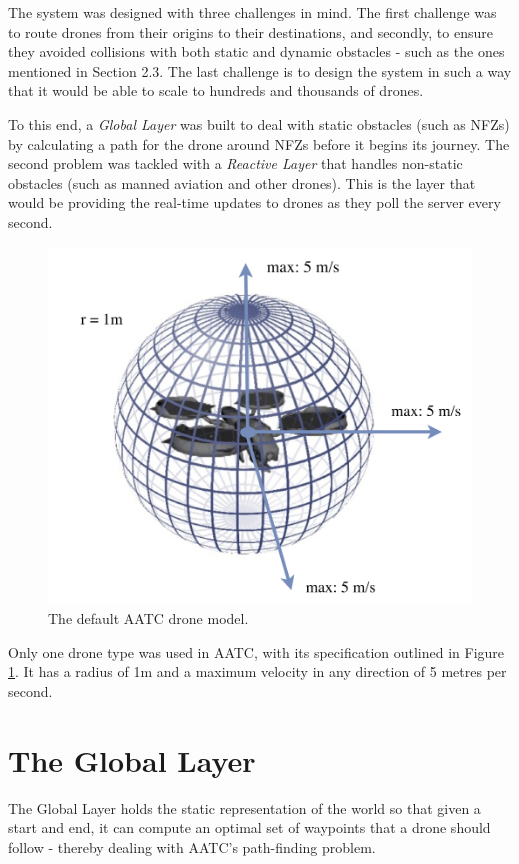 \documentclass[a4paper,11pt,titlepage]{report}
\begin{document}
The system was designed with three challenges in mind. The first challenge was to route drones from their origins to their destinations, and secondly, to ensure they avoided collisions with both static and dynamic obstacles - such as the ones mentioned in Section 2.3. The last challenge is to design the system in such a way that it would be able to scale to hundreds and thousands of drones.

\clearpage
To this end, a \textit{Global Layer} was built to deal with static obstacles (such as NFZs) by calculating a path for the drone around NFZs before it begins its journey. The second problem was tackled with a \textit{Reactive Layer} that handles non-static obstacles (such as manned aviation and other drones). This is the layer that would be providing the real-time updates to drones as they poll the server every second. \\

\begin{figure}[!hbpt]
  \center
  \includegraphics[width=0.8\linewidth]{img/edrone.jpg}
  \caption{The default AATC drone model. \cite{Balaji2017}}
  \label{fig:edrone}
\end{figure}

Only one drone type was used in AATC, with its specification outlined in Figure \ref{fig:edrone}. It has a radius of 1m and a maximum velocity in any direction of 5 metres per second.

\section{The Global Layer}
The Global Layer holds the static representation of the world so that given a start and end, it can compute an optimal set of waypoints that a drone should follow - thereby dealing with AATC's path-finding problem.
\end{document}
